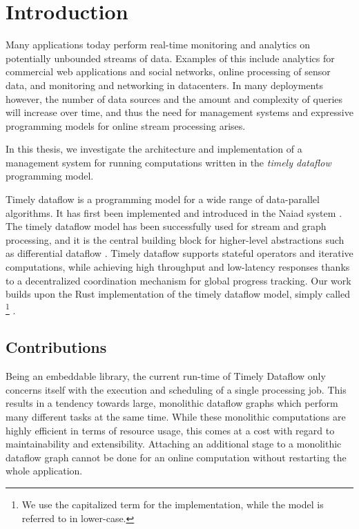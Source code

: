 \chapter{Introduction}\label{ch:introduction}

Many applications today perform real-time monitoring and analytics on
potentially unbounded streams of data. Examples of this include analytics for
commercial web applications and social networks, online processing of sensor
data, and monitoring and networking in datacenters. In many deployments however,
the number of data sources and the amount and complexity of queries will increase
over time, and thus the need for management systems and expressive programming
models for online stream processing arises.

\vspace{0.66em}
In this thesis, we investigate the architecture and implementation of a
management system for running computations written in the \emph{timely
dataflow} programming model.
\vspace{0.66em}

Timely dataflow is a programming model for a wide range of data-parallel algorithms.
It has first been implemented and introduced in the Naiad system \cite{naiad}.
The timely dataflow model has been successfully used for stream and graph
processing, and it is the central building block for
higher-level abstractions such as differential dataflow \cite{differential}.
Timely dataflow supports stateful operators and iterative computations, while
achieving high throughput and low-latency responses thanks to a decentralized
coordination mechanism for global progress tracking. Our work
builds upon the Rust implementation of the timely dataflow model,
simply called \footnote{We use the capitalized term
for the implementation, while the model is referred to in lower-case.} \cite{timely}.

\section{Contributions}

Being an embeddable library, the current run-time of Timely Dataflow only
concerns itself with the execution and scheduling of a single processing job.
This results in a tendency towards large, monolithic dataflow graphs which
perform many different tasks at the same time. While these monolithic computations
are highly efficient in terms of resource usage, this comes at a cost with regard
to maintainability and extensibility. Attaching an additional stage to a monolithic
dataflow graph cannot be done for an online computation without restarting the
whole application.


